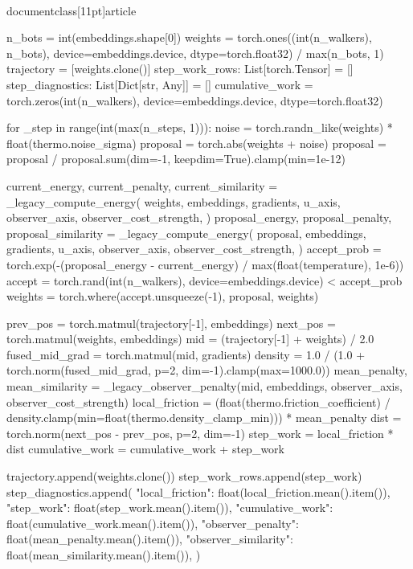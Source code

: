 \\documentclass[11pt]{article}
\begin{document}
\begin{CodeBlock}
    n_bots = int(embeddings.shape[0])
    weights = torch.ones((int(n_walkers), n_bots), device=embeddings.device, dtype=torch.float32) / max(n_bots, 1)
    trajectory = [weights.clone()]
    step_work_rows: List[torch.Tensor] = []
    step_diagnostics: List[Dict[str, Any]] = []
    cumulative_work = torch.zeros(int(n_walkers), device=embeddings.device, dtype=torch.float32)

    for _step in range(int(max(n_steps, 1))):
        noise = torch.randn_like(weights) * float(thermo.noise_sigma)
        proposal = torch.abs(weights + noise)
        proposal = proposal / proposal.sum(dim=-1, keepdim=True).clamp(min=1e-12)

        current_energy, current_penalty, current_similarity = _legacy_compute_energy(
            weights,
            embeddings,
            gradients,
            u_axis,
            observer_axis,
            observer_cost_strength,
        )
        proposal_energy, proposal_penalty, proposal_similarity = _legacy_compute_energy(
            proposal,
            embeddings,
            gradients,
            u_axis,
            observer_axis,
            observer_cost_strength,
        )
        accept_prob = torch.exp(-(proposal_energy - current_energy) / max(float(temperature), 1e-6))
        accept = torch.rand(int(n_walkers), device=embeddings.device) < accept_prob
        weights = torch.where(accept.unsqueeze(-1), proposal, weights)

        prev_pos = torch.matmul(trajectory[-1], embeddings)
        next_pos = torch.matmul(weights, embeddings)
        mid = (trajectory[-1] + weights) / 2.0
        fused_mid_grad = torch.matmul(mid, gradients)
        density = 1.0 / (1.0 + torch.norm(fused_mid_grad, p=2, dim=-1).clamp(max=1000.0))
        mean_penalty, mean_similarity = _legacy_observer_penalty(mid, embeddings, observer_axis, observer_cost_strength)
        local_friction = (float(thermo.friction_coefficient) / density.clamp(min=float(thermo.density_clamp_min))) * mean_penalty
        dist = torch.norm(next_pos - prev_pos, p=2, dim=-1)
        step_work = local_friction * dist
        cumulative_work = cumulative_work + step_work

        trajectory.append(weights.clone())
        step_work_rows.append(step_work)
        step_diagnostics.append(
            {
                "local_friction": float(local_friction.mean().item()),
                "step_work": float(step_work.mean().item()),
                "cumulative_work": float(cumulative_work.mean().item()),
                "observer_penalty": float(mean_penalty.mean().item()),
                "observer_similarity": float(mean_similarity.mean().item()),
            }
        )


\end{CodeBlock}
\end{document}
